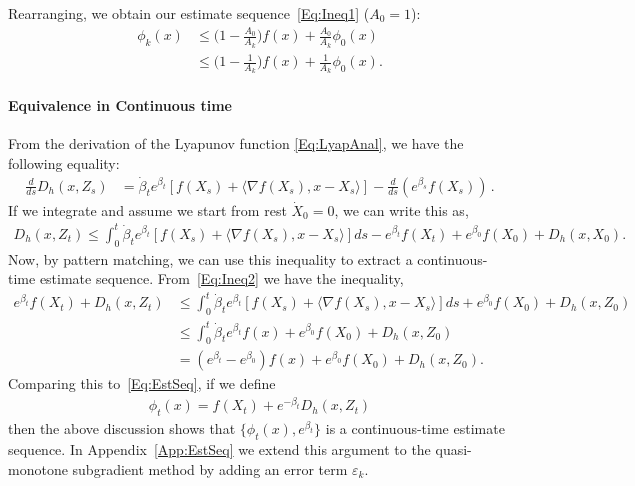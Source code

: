 \documentclass[11pt]{article}
\theoremstyle{plain}
\begin{document}
Rearranging, we obtain our estimate sequence~\eqref{Eq:Ineq1} ($A_0 = 1$):
\begin{subequations}
\begin{align}
\phi_k(x) &\leq \Big(1 -\frac{A_0}{A_k}\Big) f(x) + \frac{A_0}{A_k} \phi_0(x) \\
&\leq \Big(1 - \frac{1}{A_k}\Big)f(x) + \frac{1}{A_k}\phi_0(x).
\end{align}
\end{subequations}
\paragraph{Equivalence in Continuous time}
From the derivation of the Lyapunov function \eqref{Eq:LyapAnal}, we have the following equality:
\begin{align*}
\frac{d}{ds}D_h\left(x, Z_s\right)  &= \dot \beta_t e^{\beta_t}  [f(X_s)+ \langle \nabla f(X_s), x - X_s \rangle] -  \frac{d}{ds}\left( e^{ \beta_s}  f(X_s)\right)\,.
\end{align*}
If we integrate and assume we start from rest $\dot X_0 = 0$, we can write this as,
\begin{align}\label{Eq:Ineq2}
 D_h(x, Z_t) \leq \int_0^t\dot \beta_t e^{\beta_t} [f(X_s)+ \langle \nabla f(X_s), x - X_s \rangle]ds  -  e^{ \beta_t}  f(X_t) + e^{\beta_0} f(X_0) + D_h(x, X_0).
\end{align}
Now, by pattern matching, we can use this inequality to extract a continuous-time estimate sequence. 
From~\eqref{Eq:Ineq2} we have the inequality,
\begin{align*}
e^{\beta_t}f(X_t) + D_h(x, Z_t) &\leq \int_0^t\dot \beta_t e^{\beta_t}  [f(X_s)+ \langle \nabla f(X_s), x - X_s \rangle]ds + e^{\beta_0}f(X_0)+  D_h(x,Z_0)\\
&\leq \int_0^t \dot \beta_t e^{\beta_t}f(x) + e^{\beta_0}f(X_0)+  D_h(x,Z_0)\\
 &= (e^{\beta_t} - e^{\beta_0}) f(x) + e^{\beta_0}f(X_0)+  D_h(x,Z_0).
\end{align*}
Comparing this to~\eqref{Eq:EstSeq}, if we define
\begin{align*}
\phi_t(x)=f(X_t) + e^{-\beta_t}D_h(x, Z_t)
\end{align*}
then the above discussion shows that $\{\phi_t(x), e^{\beta_t}\}$ is a continuous-time estimate sequence. In Appendix~\ref{App:EstSeq} we extend this argument to the quasi-monotone subgradient method by adding an error term $\varepsilon_k$. 
\end{document}
